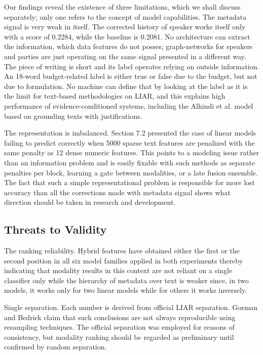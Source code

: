 \documentclass[10pt,twocolumn,twoside,a4paper]{article}
\begin{document}
Our findings reveal the existence of three limitations, which we shall discuss separately; only one refers to the concept of model capabilities. The metadata signal is very weak in itself. The corrected history of speaker works itself only with a score of 0.2284, while the baseline is 0.2081. No architecture can extract the information, which data features do not posses; graph-networks for speakers and parties are just operating on the same signal presented in a different way. The piece of writing is short and its label operates relying on outside information. An 18-word budget-related label is either true or false due to the budget, but not due to formulation. No machine can define that by looking at the label as it is the limit for text-based methodologies on LIAR, and this explains high performance of evidence-conditioned systems, including the Alhindi et al. model based on grounding texts with justifications.

The representation is imbalanced. Section 7.2 presented the case of linear models failing to predict correctly when 5000 sparse text features are penalized with the same penalty as 12 dense numeric features. This points to a modeling issue rather than an information problem and is easily fixable with such methods as separate penalties per block, learning a gate between modalities, or a late fusion ensemble. The fact that such a simple representational problem is responsible for more lost accuracy than all the corrections made with metadata signal shows what direction should be taken in research and development.

\subsection{Threats to Validity}

The ranking reliability. Hybrid features have obtained either the first or the second position in all six model families applied in both experiments thereby indicating that modality results in this context are not reliant on a single classifier only while the hierarchy of metadata over text is weaker since, in two models, it works only for two linear models while for others it works inversely.

Single separation. Each number is derived from official LIAR separation. Gorman and Bedrick \cite{gorman2019standard} claim that such conclusions are not always reproducible using resampling techniques. The official separation was employed for reasons of consistency, but modality ranking should be regarded as preliminary until confirmed by random separation.
\end{document}
